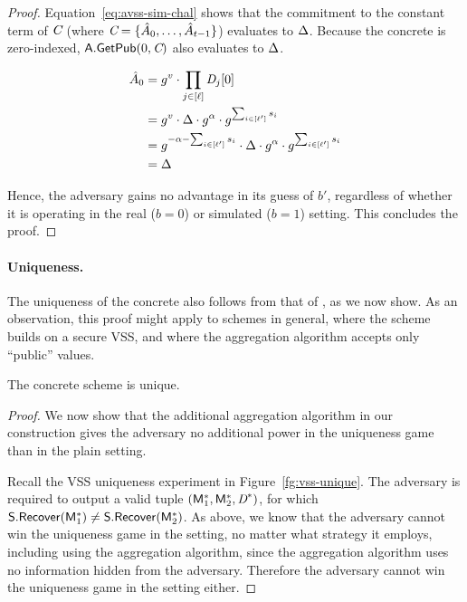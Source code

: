 \begin{proof}
  \begin{sloppypar}
  Equation~\ref{eq:avss-sim-chal} shows that the commitment to the constant term of $\textit{C}$
  (where $\textit{C} = \{\hat{A}_0, \ldots, \hat{A}_{t-1} \}$) evaluates to $\Delta$.
  Because the concrete \AVSS is zero-indexed,
  $\mathsf{A}.\mathsf{GetPub}(0, \textit{C})$ also evaluates to $\Delta$.
  \end{sloppypar}

\begin{equation}\label{eq:avss-sim-chal}
 \begin{split}
   \hat{A}_0 & = g^{v} \cdot \prod_{j \in [\mathsf{\ell}]} \textit{D}_j[0]   \\
   & = g^v \cdot \Delta \cdot g^\alpha \cdot g^{\sum_{i \in [{\mathsf{\ell}'}]} s_i }  \\
   & = g^{- \alpha - \sum_{i \in [{\mathsf{\ell}'}]} s_i } \cdot \Delta \cdot g^\alpha \cdot g^{\sum_{i \in [{\mathsf{\ell}'}]} s_i } \\
   & = \Delta \\
 \end{split}
\end{equation}

Hence, the adversary gains no advantage in its guess of $b'$,
regardless of whether it is operating in the real ($b=0$)
or simulated ($b=1$) setting.
This concludes the proof.
\end{proof}

\paragraph{Uniqueness.}
The uniqueness of the concrete \AVSS also follows from that of \FeldVariant, as we now show.
As an observation,
this proof might apply to \AVSS schemes in general,
where the scheme builds on a secure VSS,
and where the aggregation algorithm accepts only ``public'' values.

\begin{theorem}
  The concrete \AVSS scheme is unique.
\end{theorem}

\begin{proof}
  We now show that the additional aggregation algorithm in our \AVSS construction gives the adversary no additional power in the uniqueness game than in the plain \FeldVariant setting.

  Recall the VSS uniqueness experiment in Figure~\ref{fg:vss-unique}.
  The adversary is required to output a valid tuple $(\mathsf{M}_1^*, \mathsf{M}_2^*, \textit{D}^*)$,
  for which $\mathsf{S}.\mathsf{Recover}(\mathsf{M}_1^*) \neq \mathsf{S}.\mathsf{Recover}(\mathsf{M}_2^*)$.
  As above, we know that the adversary cannot win the uniqueness game in the \FeldVariant setting,
  no matter what strategy it employs,
  including using the \AVSS aggregation algorithm,
  since the aggregation algorithm uses no information hidden from the adversary.
  Therefore the adversary cannot win the uniqueness game in the \AVSS setting either.
\end{proof}


